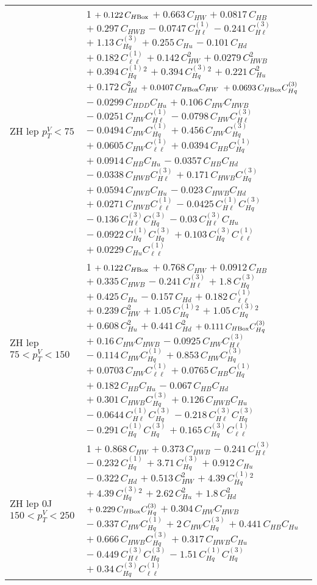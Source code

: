 \begin{tabular}{l|p{}}
    ZH lep $p_{T}^{V} < 75$ & 1 $+\;0.122\,C_{H\rm{Box}}$ $+\;0.663\,C_{HW}$ $+\;0.0817\,C_{HB}$ $+\;0.297\,C_{HWB}$ $-\;0.0747\,C^{(1)}_{H\ell}$ $-\;0.241\,C^{(3)}_{H\ell}$ $+\;1.13\,C^{(3)}_{Hq}$ $+\;0.255\,C_{Hu}$ $-\;0.101\,C_{Hd}$ $+\;0.182\,C^{(1)}_{\ell\ell}$ $+\;0.142\,C_{HW}^{2}$ $+\;0.0279\,C_{HWB}^{2}$ $+\;0.394\,C^{(1)}_{Hq}^{2}$ $+\;0.394\,C^{(3)}_{Hq}^{2}$ $+\;0.221\,C_{Hu}^{2}$ $+\;0.172\,C_{Hd}^{2}$ $+\;0.0407\,C_{H\rm{Box}}C_{HW}$ $+\;0.0693\,C_{H\rm{Box}}C^{(3)}_{Hq}$ $-\;0.0299\,C_{HDD}C_{Hu}$ $+\;0.106\,C_{HW}C_{HWB}$ $-\;0.0251\,C_{HW}C^{(1)}_{H\ell}$ $-\;0.0798\,C_{HW}C^{(3)}_{H\ell}$ $-\;0.0494\,C_{HW}C^{(1)}_{Hq}$ $+\;0.456\,C_{HW}C^{(3)}_{Hq}$ $+\;0.0605\,C_{HW}C^{(1)}_{\ell\ell}$ $+\;0.0394\,C_{HB}C^{(1)}_{Hq}$ $+\;0.0914\,C_{HB}C_{Hu}$ $-\;0.0357\,C_{HB}C_{Hd}$ $-\;0.0338\,C_{HWB}C^{(3)}_{H\ell}$ $+\;0.171\,C_{HWB}C^{(3)}_{Hq}$ $+\;0.0594\,C_{HWB}C_{Hu}$ $-\;0.023\,C_{HWB}C_{Hd}$ $+\;0.0271\,C_{HWB}C^{(1)}_{\ell\ell}$ $-\;0.0425\,C^{(1)}_{H\ell}C^{(3)}_{Hq}$ $-\;0.136\,C^{(3)}_{H\ell}C^{(3)}_{Hq}$ $-\;0.03\,C^{(3)}_{H\ell}C_{Hu}$ $-\;0.0922\,C^{(1)}_{Hq}C^{(3)}_{Hq}$ $+\;0.103\,C^{(3)}_{Hq}C^{(1)}_{\ell\ell}$ $+\;0.0229\,C_{Hu}C^{(1)}_{\ell\ell}$ \\
    ZH lep $75 < p_{T}^{V} < 150$ & 1 $+\;0.122\,C_{H\rm{Box}}$ $+\;0.768\,C_{HW}$ $+\;0.0912\,C_{HB}$ $+\;0.335\,C_{HWB}$ $-\;0.241\,C^{(3)}_{H\ell}$ $+\;1.8\,C^{(3)}_{Hq}$ $+\;0.425\,C_{Hu}$ $-\;0.157\,C_{Hd}$ $+\;0.182\,C^{(1)}_{\ell\ell}$ $+\;0.239\,C_{HW}^{2}$ $+\;1.05\,C^{(1)}_{Hq}^{2}$ $+\;1.05\,C^{(3)}_{Hq}^{2}$ $+\;0.608\,C_{Hu}^{2}$ $+\;0.441\,C_{Hd}^{2}$ $+\;0.111\,C_{H\rm{Box}}C^{(3)}_{Hq}$ $+\;0.16\,C_{HW}C_{HWB}$ $-\;0.0925\,C_{HW}C^{(3)}_{H\ell}$ $-\;0.114\,C_{HW}C^{(1)}_{Hq}$ $+\;0.853\,C_{HW}C^{(3)}_{Hq}$ $+\;0.0703\,C_{HW}C^{(1)}_{\ell\ell}$ $+\;0.0765\,C_{HB}C^{(1)}_{Hq}$ $+\;0.182\,C_{HB}C_{Hu}$ $-\;0.067\,C_{HB}C_{Hd}$ $+\;0.301\,C_{HWB}C^{(3)}_{Hq}$ $+\;0.126\,C_{HWB}C_{Hu}$ $-\;0.0644\,C^{(1)}_{H\ell}C^{(3)}_{Hq}$ $-\;0.218\,C^{(3)}_{H\ell}C^{(3)}_{Hq}$ $-\;0.291\,C^{(1)}_{Hq}C^{(3)}_{Hq}$ $+\;0.165\,C^{(3)}_{Hq}C^{(1)}_{\ell\ell}$ \\
    ZH lep 0J $150 < p_{T}^{V} < 250$ & 1 $+\;0.868\,C_{HW}$ $+\;0.373\,C_{HWB}$ $-\;0.241\,C^{(3)}_{H\ell}$ $-\;0.232\,C^{(1)}_{Hq}$ $+\;3.71\,C^{(3)}_{Hq}$ $+\;0.912\,C_{Hu}$ $-\;0.322\,C_{Hd}$ $+\;0.513\,C_{HW}^{2}$ $+\;4.39\,C^{(1)}_{Hq}^{2}$ $+\;4.39\,C^{(3)}_{Hq}^{2}$ $+\;2.62\,C_{Hu}^{2}$ $+\;1.8\,C_{Hd}^{2}$ $+\;0.229\,C_{H\rm{Box}}C^{(3)}_{Hq}$ $+\;0.304\,C_{HW}C_{HWB}$ $-\;0.337\,C_{HW}C^{(1)}_{Hq}$ $+\;2\,C_{HW}C^{(3)}_{Hq}$ $+\;0.441\,C_{HB}C_{Hu}$ $+\;0.666\,C_{HWB}C^{(3)}_{Hq}$ $+\;0.317\,C_{HWB}C_{Hu}$ $-\;0.449\,C^{(3)}_{H\ell}C^{(3)}_{Hq}$ $-\;1.51\,C^{(1)}_{Hq}C^{(3)}_{Hq}$ $+\;0.34\,C^{(3)}_{Hq}C^{(1)}_{\ell\ell}$ \\

\end{tabular}
